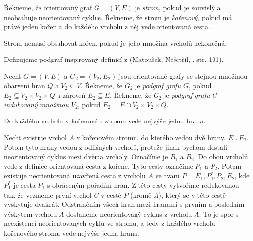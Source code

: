 \begin{definice}[Strom]
    Řekneme, že orientovaný graf $G=(V,E)$ je \emph{strom}, pokud je souvislý a neobsahuje neorientovaný cyklus. Řekneme, že strom je \emph{kořenový}, pokud má právě jeden kořen a do každého vrcholu z něj vede orientovaná cesta. 
\end{definice}
\begin{pozn}
    Strom nemusí obsahovat kořen, pokud je jeho množina vrcholů nekonečná. 
\end{pozn}

Definujeme podgraf inspirovaný definicí z (Matoušek, Nešetřil, \cite{matouvsek2009kapitoly}, str. 101).
\begin{definice}[Podgraf]
    Nechť $G = (V,E)$ a $G_2 = (V_2, E_2)$ jsou orientované grafy se stejnou množinou obarvení hran $Q$ a $V_2 \subseteq V$. Řekneme, že $G_2$ je \emph{podgraf grafu $G$}, pokud $E_2 \subseteq V_2 \times V_2 \times Q$ a zároveň $E_2 \subseteq E$.
    Řekneme, že $G_2$ je \emph{podgraf grafu $G$ indukovaný množinou $V_2$}, pokud $E_2 =  E \cap V_2\times V_2 \times Q$.
\end{definice}

\begin{lemma}\label{lemma-max-jedna-vchazejici-cesta}
    Do každého vrcholu v kořenovém stromu vede nejvýše jedna hrana.
\end{lemma}
\begin{dukaz}
    Nechť existuje vrchol $A$ v kořenovém stromu, do kterého vedou dvě hrany, $E_1, E_2$. Potom tyto hrany vedou z odlišných vrcholů, protože jinak bychom dostali neorientovaný cyklus mezi dvěma vrcholy. Označíme je $B_1$ a $B_2$. Do obou vrcholů vede z definice orientovaná cesta z kořene. Tyto cesty označíme $P_1$ a $P_2$. Potom existuje neorientovaná uzavřená cesta z vrcholu $A$ ve tvaru $P = E_1, P_1^*, P_2, E_2$, kde $P_1^*$ je cesta $P_1$ s obráceným pořadím hran. Z této cesty vytvoříme redukovanou tak, že vezmeme první vrchol $C$ v cestě $P$ (kromě $A$), který se v této cestě vyskytuje dvakrát. Odstraněním všech hran mezi hranami s prvním a posledním výskytem vrcholu $A$ dostaneme neorientovaný cyklus z vrcholu $A$. To je spor s neexistencí neorientovaných cyklů ve stromu, a tedy z každého vrcholu kořenového stromu vede nejvýše jedna hrana.
\end{dukaz}


